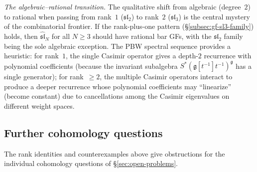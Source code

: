 \emph{The algebraic--rational transition.}
The qualitative shift from algebraic (degree~$2$) to rational when passing
from rank~$1$ ($\mathfrak{sl}_2$) to rank~$2$ ($\mathfrak{sl}_3$) is the
central mystery of the combinatorial frontier.  If the rank-plus-one pattern
(\S\ref{subsec:gf-sl3-family}) holds, then $\widehat{\mathfrak{sl}}_N$
for all $N \geq 3$ should have rational bar GFs, with the $\mathfrak{sl}_2$
family being the sole algebraic exception.  The PBW spectral sequence
provides a heuristic: for rank~$1$, the single Casimir operator gives
a depth-$2$ recurrence with polynomial coefficients (because the
invariant subalgebra $S^*(\mathfrak{g}[t^{-1}]t^{-1})^{\mathfrak{g}}$ has a
single generator); for rank~$\geq 2$, the multiple Casimir operators
interact to produce a deeper recurrence whose polynomial coefficients
may ``linearize'' (become constant) due to cancellations among the
Casimir eigenvalues on different weight spaces.

\subsection{Further cohomology questions}
\label{subsec:updated-frontier}

The rank identities and counterexamples above give obstructions
for the individual cohomology questions of \S\ref{sec:open-problems}.

